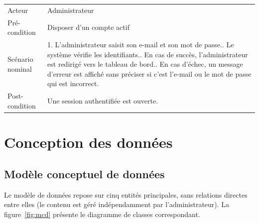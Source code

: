 \documentclass[11pt,a4paper]{report}
\begin{document}
\begin{center}
\begin{longtable}{L{3.3cm} L{9.2cm}}
\toprule
{}
 \\
\midrule
\endhead
Acteur & Administrateur \\
Pré-condition & Disposer d'un compte actif \\
Scénario nominal &
1. L'administrateur saisit son e-mail et son mot de passe.. Le système vérifie les identifiants.. En cas de succès, l'administrateur est redirigé vers le tableau de bord.. En cas d'échec, un message d'erreur est affiché sans préciser si c'est
l'e-mail ou le mot de passe qui est incorrect. \\
Post-condition & Une session authentifiée est ouverte. \\
\bottomrule
\end{longtable}
\end{center}

\chapter{Conception des données}

\section{Modèle conceptuel de données}

Le modèle de données repose sur cinq entités principales, sans relations
directes entre elles (le contenu est géré indépendamment par
l'administrateur). La figure~\ref{fig:mcd} présente le diagramme de classes
correspondant.
\end{document}
